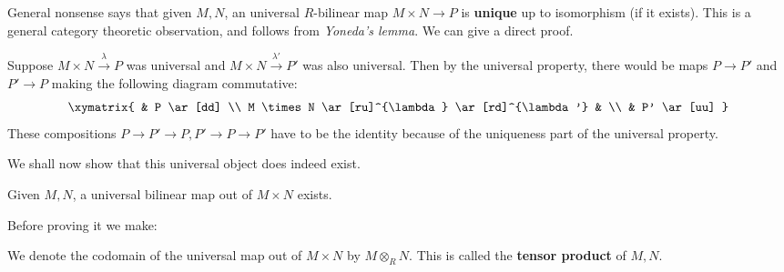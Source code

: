 General nonsense says that given $M,N$, an universal $R$-bilinear map $M
\times N \to P$ is
\textbf{unique} up to isomorphism (if it exists). This is a general category
theoretic observation, and follows from \emph{Yoneda's lemma}.
We can give a direct proof.

Suppose $M \times N \stackrel{\lambda}{\to} P$ was universal and $M \times N
\stackrel{\lambda'}{\to} P'$ was also
universal. Then by the universal property, there would be maps $P \to P'$
and $P' \to P$ making the
following diagram commutative:
\[
\xymatrix{
& P \ar[dd] \\
M \times N \ar[ru]^{\lambda} \ar[rd]^{\lambda'} & \\
& P' \ar[uu]
}
\]
These compositions $P \to P' \to P, P' \to P \to P'$ have to be the identity
because of the uniqueness part of the universal property.

We shall now show that this universal object does indeed exist.

\begin{proposition} \label{tensorexists}
Given $M,N$, a universal bilinear map out of $M \times N$ exists.
\end{proposition}

Before proving it we make:
\begin{definition}
We denote the codomain of the universal map out of $M \times N $ by $M
\otimes_R N$. This is called the \textbf{tensor product} of $M,N$.
\end{definition}

